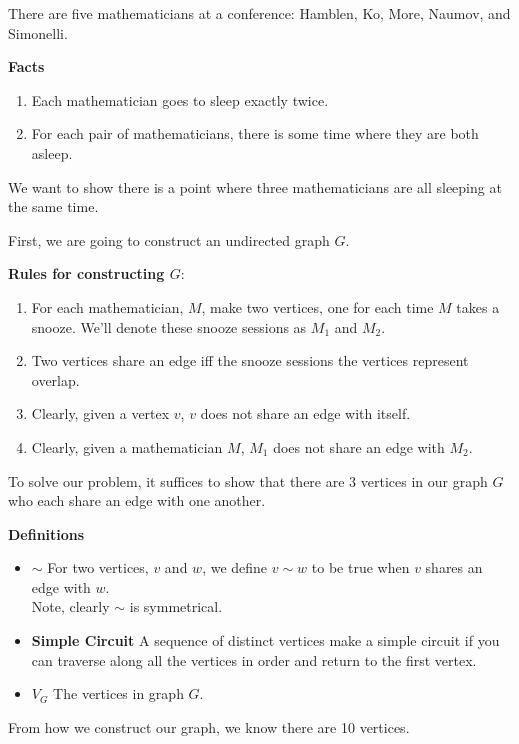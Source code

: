 \documentclass[fleqn]{article}
\begin{document}
There are five mathematicians at a conference: Hamblen, Ko, More, Naumov, and Simonelli.

\textbf{Facts}
\begin{enumerate}
  \item  Each mathematician goes to sleep exactly twice.

  \item  For each pair of mathematicians, there is some time where
         they are both asleep.
\end{enumerate}

We want to show there is a point where three mathematicians are all sleeping at the same time.

First, we are going to construct an undirected graph $G$.

\textbf{Rules for constructing $G$}:
\begin{enumerate}
  \item For each mathematician, $M$, make two vertices, one for each
        time $M$ takes a snooze. We'll denote these snooze sessions
        as $M_1$ and $M_2$.
  \item Two vertices share an edge iff the snooze sessions the vertices
        represent overlap.
  \item Clearly, given a vertex $v$, $v$ does not share an edge with
        itself.
  \item Clearly, given a mathematician $M$, $M_1$ does not share an
        edge with $M_2$.
\end{enumerate}

To solve our problem, it suffices to show that there are 3 vertices in our graph $G$ who each share an edge with one another.

\textbf{Definitions}
\begin{itemize}
  \item \textbf{$\sim$} For two vertices, $v$ and $w$, we define $v \sim w$
                to be true when $v$ shares an edge with $w$.\\
                Note, clearly $\sim$ is symmetrical.
  \item \textbf{Simple Circuit}  A sequence of distinct vertices make a 
                        simple circuit if you can traverse along
                        all the vertices in order and 
                        return to the first vertex.
  \item \textbf{$V_G$} The vertices in graph $G$.
\end{itemize}

From how we construct our graph, we know there are 10 vertices.
\end{document}
